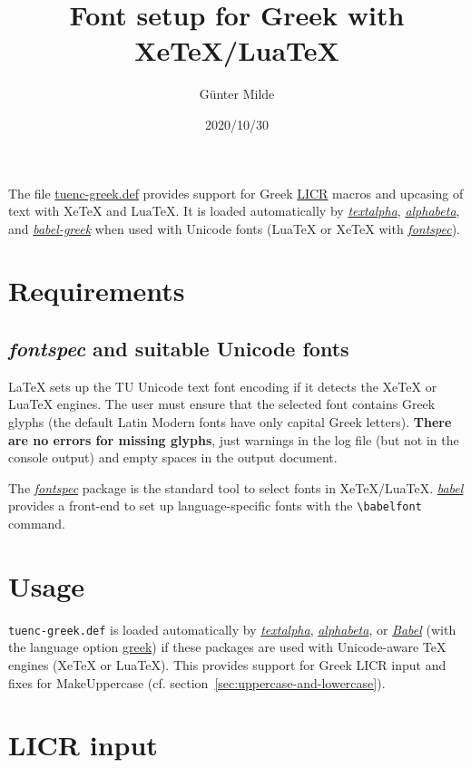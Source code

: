 \documentclass[a4paper]{scrartcl}
\newcommand{\pkgref}[1]{\emph{\href{https://ctan.org/pkg/#1}{#1}}}
\begin{document}
\title{Font setup for Greek with XeTeX/LuaTeX}
\author{Günter Milde}
\date{2020/10/30}
\maketitle

\noindent The file \href{tuenc-greek.def.html}{tuenc-greek.def} provides
support for Greek \hyperref[licr]{LICR} macros and upcasing of text with
XeTeX and LuaTeX. It is loaded automatically by
\href{textalpha-doc.pdf}{\emph{textalpha}},
\href{alphabeta-doc.pdf}{\emph{alphabeta}},
and \pkgref{babel-greek} when used with Unicode fonts
(LuaTeX or XeTeX with \pkgref{fontspec}).

\tableofcontents

\section{Requirements}

\subsection{\emph{fontspec} and suitable Unicode fonts}

LaTeX sets up the TU Unicode text font encoding if it detects the XeTeX or
LuaTeX engines. The user must ensure that the selected font contains Greek
glyphs (the default Latin Modern fonts have only capital Greek letters).
\textbf{There are no errors for missing glyphs}, just warnings in the log
file (but not in the console output) and empty spaces in the output
document.

The \pkgref{fontspec} package is the standard tool to select fonts in
XeTeX/LuaTeX. \pkgref{babel} provides a front-end to set
up language-specific fonts with the \verb|\babelfont| command.

\section{Usage}

\texttt{tuenc-greek.def} is loaded automatically by
\href{textalpha-doc.pdf}{\emph{textalpha}},
\href{alphabeta-doc.pdf}{\emph{alphabeta}}, or \pkgref{Babel} (with the
language option \href{https://ctan.org/pkg/babel-greek}{greek}) if these
packages are used with Unicode-aware TeX engines (XeTeX or LuaTeX). This
provides support for Greek LICR input and fixes for MakeUppercase
(cf. section~\ref{sec:uppercase-and-lowercase}).


\section{LICR input%
         \label{licr}}
\end{document}
